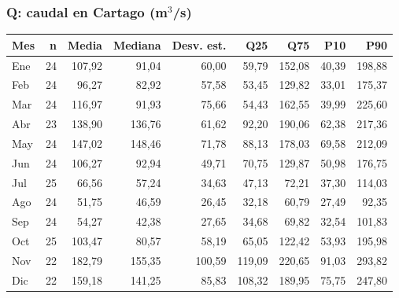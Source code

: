 \documentclass[10pt,a4paper]{article}
\begin{document}
\subsubsection*{Q: caudal en Cartago (m$^3$/s)}
\begin{center}\small\begin{tabular}{lrrrrrrrr}\hline
Mes & n & Media & Mediana & Desv. est. & Q25 & Q75 & P10 & P90 \\\hline
Ene & 24 & 107,92 & 91,04 & 60,00 & 59,79 & 152,08 & 40,39 & 198,88\\
Feb & 24 & 96,27 & 82,92 & 57,58 & 53,45 & 129,82 & 33,01 & 175,37\\
Mar & 24 & 116,97 & 91,93 & 75,66 & 54,43 & 162,55 & 39,99 & 225,60\\
Abr & 23 & 138,90 & 136,76 & 61,62 & 92,20 & 190,06 & 62,38 & 217,36\\
May & 24 & 147,02 & 148,46 & 71,78 & 88,13 & 178,03 & 69,58 & 212,09\\
Jun & 24 & 106,27 & 92,94 & 49,71 & 70,75 & 129,87 & 50,98 & 176,75\\
Jul & 25 & 66,56 & 57,24 & 34,63 & 47,13 & 72,21 & 37,30 & 114,03\\
Ago & 24 & 51,75 & 46,59 & 26,45 & 32,18 & 60,79 & 27,49 & 92,35\\
Sep & 24 & 54,27 & 42,38 & 27,65 & 34,68 & 69,82 & 32,54 & 101,83\\
Oct & 25 & 103,47 & 80,57 & 58,19 & 65,05 & 122,42 & 53,93 & 195,98\\
Nov & 22 & 182,79 & 155,35 & 100,59 & 119,09 & 220,65 & 91,03 & 293,82\\
Dic & 22 & 159,18 & 141,25 & 85,83 & 108,32 & 189,95 & 75,75 & 247,80\\
\hline\end{tabular}\end{center}
\end{document}
